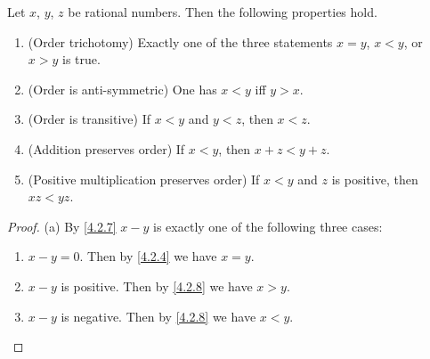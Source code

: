 \begin{prop}\label{4.2.9}
  Let \(x\), \(y\), \(z\) be rational numbers.
  Then the following properties hold.
  \begin{enumerate}
    \item (Order trichotomy)
          Exactly one of the three statements \(x = y\), \(x < y\), or \(x > y\) is true.
    \item (Order is anti-symmetric)
          One has \(x < y\) iff \(y > x\).
    \item (Order is transitive)
          If \(x < y\) and \(y < z\), then \(x < z\).
    \item (Addition preserves order)
          If \(x < y\), then \(x + z < y + z\).
    \item (Positive multiplication preserves order)
          If \(x < y\) and \(z\) is positive, then \(xz < yz\).
  \end{enumerate}
\end{prop}

\begin{proof}{(a)}
  By \cref{4.2.7} \(x - y\) is exactly one of the following three cases:
  \begin{enumerate}[label=(\Roman*)]
    \item \(x - y = 0\).
          Then by \cref{4.2.4} we have \(x = y\).
    \item \(x - y\) is positive.
          Then by \cref{4.2.8} we have \(x > y\).
    \item \(x - y\) is negative.
          Then by \cref{4.2.8} we have \(x < y\).
  \end{enumerate}
\end{proof}


